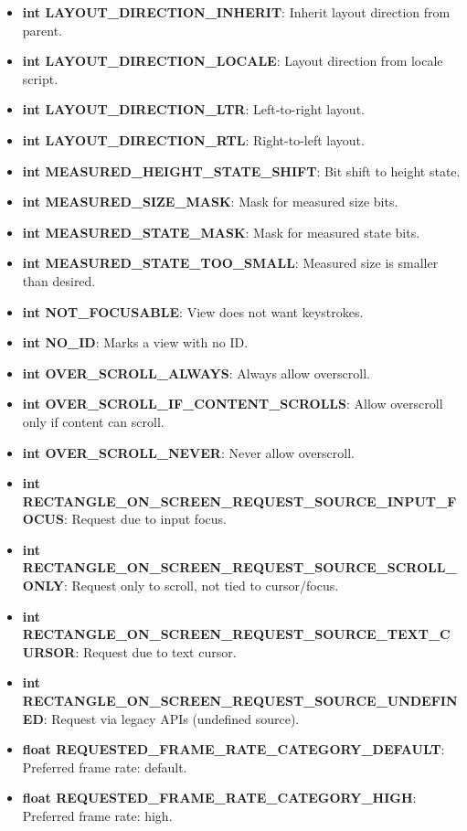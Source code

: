 \documentclass{report}
\begin{document}
\begin{itemize}
\begin{itemize}
                \item \textbf{int LAYOUT\_DIRECTION\_INHERIT}: Inherit layout direction from parent.
                \item \textbf{int LAYOUT\_DIRECTION\_LOCALE}: Layout direction from locale script.
                \item \textbf{int LAYOUT\_DIRECTION\_LTR}: Left-to-right layout.
                \item \textbf{int LAYOUT\_DIRECTION\_RTL}: Right-to-left layout.
                \item \textbf{int MEASURED\_HEIGHT\_STATE\_SHIFT}: Bit shift to height state.
                \item \textbf{int MEASURED\_SIZE\_MASK}: Mask for measured size bits.
                \item \textbf{int MEASURED\_STATE\_MASK}: Mask for measured state bits.
                \item \textbf{int MEASURED\_STATE\_TOO\_SMALL}: Measured size is smaller than desired.
                \item \textbf{int NOT\_FOCUSABLE}: View does not want keystrokes.
                \item \textbf{int NO\_ID}: Marks a view with no ID.
                \item \textbf{int OVER\_SCROLL\_ALWAYS}: Always allow overscroll.
                \item \textbf{int OVER\_SCROLL\_IF\_CONTENT\_SCROLLS}: Allow overscroll only if content can scroll.
                \item \textbf{int OVER\_SCROLL\_NEVER}: Never allow overscroll.
                \item \textbf{int RECTANGLE\_ON\_SCREEN\_REQUEST\_SOURCE\_INPUT\_FOCUS}: Request due to input focus.
                \item \textbf{int RECTANGLE\_ON\_SCREEN\_REQUEST\_SOURCE\_SCROLL\_ONLY}: Request only to scroll, not tied to cursor/focus.
                \item \textbf{int RECTANGLE\_ON\_SCREEN\_REQUEST\_SOURCE\_TEXT\_CURSOR}: Request due to text cursor.
                \item \textbf{int RECTANGLE\_ON\_SCREEN\_REQUEST\_SOURCE\_UNDEFINED}: Request via legacy APIs (undefined source).
                \item \textbf{float REQUESTED\_FRAME\_RATE\_CATEGORY\_DEFAULT}: Preferred frame rate: default.
                \item \textbf{float REQUESTED\_FRAME\_RATE\_CATEGORY\_HIGH}: Preferred frame rate: high.

\end{itemize}
\end{itemize}
\end{document}
